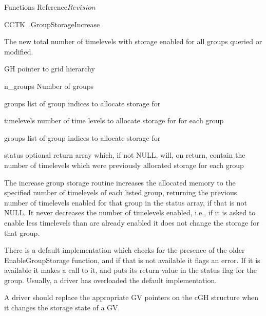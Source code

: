 \begin{cactuspart}{ Functions Reference}{}{$Revision$}
\begin{FunctionDescription}{CCTK\_GroupStorageIncrease}
\begin{ResultSection}
\begin{Result}{}
  The new total number of timelevels with storage enabled for all
  groups queried or modified.
\end{Result}
\end{ResultSection}

\begin{ParameterSection}
\begin{Parameter}{GH}
pointer to grid hierarchy
\end{Parameter}
\begin{Parameter}{n\_groups}
Number of groups
\end{Parameter}
\begin{Parameter}{groups}
list of group indices to allocate storage for
\end{Parameter}
\begin{Parameter}{timelevels}
number of time levels to allocate storage for for each group
\end{Parameter}
\begin{Parameter}{groups}
list of group indices to allocate storage for
\end{Parameter}
\begin{Parameter}{status}
  optional return array which, if not NULL, will, on return, contain
  the number of timelevels which were previously allocated storage for
  each group
\end{Parameter}
\end{ParameterSection}

\begin{Discussion}
  The increase group storage routine increases the allocated memory to
  the specified number of timelevels of each listed group, returning
  the previous number of timelevels enabled for that group in the
  status array, if that is not NULL.  It never decreases the number of
  timelevels enabled, i.e., if it is asked to enable less timelevels
  than are already enabled it does not change the storage for that
  group.

  There is a default implementation which checks for the presence of
  the older EnableGroupStorage function, and if that is not available
  it flags an error.  If it is available it makes a call to it, and
  puts its return value in the status flag for the group.  Usually, a
  driver has overloaded the default implementation.

  A driver should replace the appropriate GV pointers on the cGH
  structure when it changes the storage state of a GV.
\end{Discussion}
\end{FunctionDescription}




\end{cactuspart}
